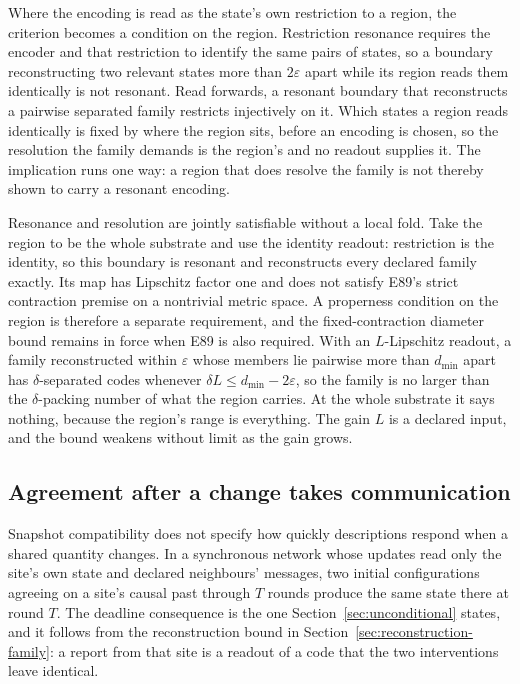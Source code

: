 \documentclass[12pt]{article}
\begin{document}
Where the encoding is read as the state's own restriction to a region, the criterion becomes a condition on the region. Restriction resonance requires the encoder and that restriction to identify the same pairs of states, so a boundary reconstructing two relevant states more than $2\varepsilon$ apart while its region reads them identically is not resonant. Read forwards, a resonant boundary that reconstructs a pairwise separated family restricts injectively on it. Which states a region reads identically is fixed by where the region sits, before an encoding is chosen, so the resolution the family demands is the region's and no readout supplies it. The implication runs one way: a region that does resolve the family is not thereby shown to carry a resonant encoding.

Resonance and resolution are jointly satisfiable without a local fold. Take the region to be the whole substrate and use the identity readout: restriction is the identity, so this boundary is resonant and reconstructs every declared family exactly. Its map has Lipschitz factor one and does not satisfy E89's strict contraction premise on a nontrivial metric space. A properness condition on the region is therefore a separate requirement, and the fixed-contraction diameter bound remains in force when E89 is also required. With an $L$-Lipschitz readout, a family reconstructed within $\varepsilon$ whose members lie pairwise more than $d_{\min}$ apart has $\delta$-separated codes whenever $\delta L\leq d_{\min}-2\varepsilon$, so the family is no larger than the $\delta$-packing number of what the region carries. At the whole substrate it says nothing, because the region's range is everything. The gain $L$ is a declared input, and the bound weakens without limit as the gain grows.

\subsection{Agreement after a change takes communication}

Snapshot compatibility does not specify how quickly descriptions respond when a shared quantity changes. In a synchronous network whose updates read only the site's own state and declared neighbours' messages, two initial configurations agreeing on a site's causal past through $T$ rounds produce the same state there at round $T$. The deadline consequence is the one Section~\ref{sec:unconditional} states, and it follows from the reconstruction bound in Section~\ref{sec:reconstruction-family}: a report from that site is a readout of a code that the two interventions leave identical.
\end{document}
